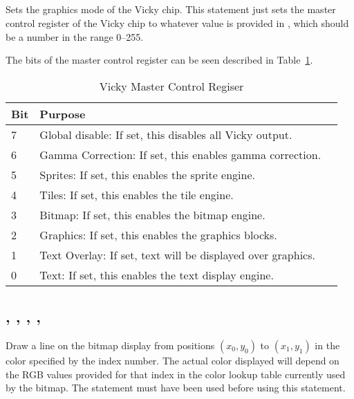 \documentclass{report}
\begin{document}
    \subsection*{ }

    Sets the graphics mode of the Vicky chip.
    This statement just sets the master control register of the Vicky chip to
    whatever value is provided in , which should be a number in the range 0--255.

    The bits of the master control register can be seen described in Table~\ref{vicky_mcr}.

    \begin{table}
        \begin{tabular}{|l|l|l|} \hline
            Bit & Purpose \\ \hline\hline
            7 & Global disable: If set, this disables all Vicky output. \\ \hline
            6 & Gamma Correction: If set, this enables gamma correction. \\ \hline
            5 & Sprites: If set, this enables the sprite engine. \\ \hline
            4 & Tiles: If set, this enables the tile engine. \\ \hline
            3 & Bitmap: If set, this enables the bitmap engine. \\ \hline
            2 & Graphics: If set, this enables the graphics blocks. \\ \hline
            1 & Text Overlay: If set, text will be displayed over graphics. \\ \hline
            0 & Text: If set, this enables the text display engine. \\ \hline
        \end{tabular}
        \caption{Vicky Master Control Regiser}
        \label{vicky_mcr}
    \end{table}

    \subsection*{ , , , , }

    Draw a line on the bitmap display from positions $(x_0, y_0)$ to $(x_1, y_1)$ in the color
    specified by the  index number.
    The actual color displayed will depend on the RGB values provided for
    that index in the color lookup table currently used by the bitmap.
    The  statement must have been used before using
    this statement.
\end{document}
